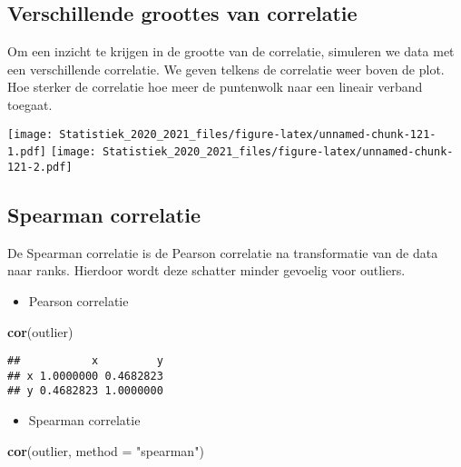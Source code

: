 \documentclass[
  12pt,dutch,coursenotes]{book}
\newenvironment{Shaded}{\begin{snugshade}}{\end{snugshade}}
\newcommand{\DataTypeTok}[1]{\textcolor[rgb]{0.13,0.29,0.53}{#1}}
\newcommand{\KeywordTok}[1]{\textcolor[rgb]{0.13,0.29,0.53}{\textbf{#1}}}
\newcommand{\NormalTok}[1]{#1}
\newcommand{\StringTok}[1]{\textcolor[rgb]{0.31,0.60,0.02}{#1}}
\providecommand{\tightlist}{%
  \setlength{\itemsep}{0pt}\setlength{\parskip}{0pt}}
\theoremstyle{definition}
\theoremstyle{definition}
\theoremstyle{definition}
\theoremstyle{remark}
\begin{document}
\hypertarget{verschillende-groottes-van-correlatie}{%
\subsection{Verschillende groottes van correlatie}\label{verschillende-groottes-van-correlatie}}

Om een inzicht te krijgen in de grootte van de correlatie, simuleren we data met een verschillende correlatie. We geven telkens de correlatie weer boven de plot. Hoe sterker de correlatie hoe meer de puntenwolk naar een lineair verband toegaat.

\texttt{[image: Statistiek\_2020\_2021\_files/figure-latex/unnamed-chunk-121-1.pdf]} \texttt{[image: Statistiek\_2020\_2021\_files/figure-latex/unnamed-chunk-121-2.pdf]}

\hypertarget{spearman-correlatie}{%
\subsection{Spearman correlatie}\label{spearman-correlatie}}

De Spearman correlatie is de Pearson correlatie na transformatie van de data naar ranks. Hierdoor wordt deze schatter minder gevoelig voor outliers.

\begin{itemize}
\tightlist
\item
  Pearson correlatie
\end{itemize}

\begin{Shaded}
\begin{Highlighting}[]
\KeywordTok{cor}\NormalTok{(outlier)}
\end{Highlighting}
\end{Shaded}

\begin{verbatim}
##           x         y
## x 1.0000000 0.4682823
## y 0.4682823 1.0000000
\end{verbatim}

\begin{itemize}
\tightlist
\item
  Spearman correlatie
\end{itemize}

\begin{Shaded}
\begin{Highlighting}[]
\KeywordTok{cor}\NormalTok{(outlier, }\DataTypeTok{method =} \StringTok{"spearman"}\NormalTok{)}
\end{Highlighting}
\end{Shaded}
\end{document}
